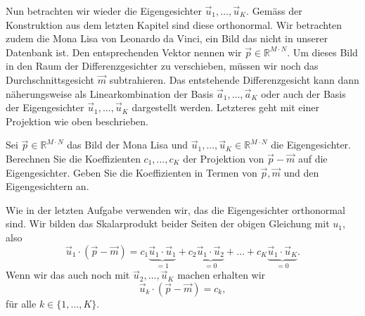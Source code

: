 Nun betrachten wir wieder die Eigengesichter $\vec u_1,\ldots,\vec u_K$.
Gemäss der Konstruktion aus dem letzten Kapitel sind diese orthonormal.
Wir betrachten zudem die Mona Lisa von Leonardo da Vinci, ein Bild das nicht in unserer Datenbank ist.
Den entsprechenden Vektor nennen wir $\vec p\in\mathbb R^{M\cdot N}$.
Um dieses Bild in den Raum der Differenzgesichter zu verschieben, müssen wir noch das Durchschnittsgesicht $\vec m$ subtrahieren.
Das entstehende Differenzgesicht kann dann näherungsweise als Linearkombination der Basis $\vec a_1,\ldots,\vec a_K$ oder auch der Basis der Eigengesichter $\vec u_1,\ldots,\vec u_K$ dargestellt werden.
Letzteres geht mit einer Projektion wie oben beschrieben.
\begin{aufgabe}
	Sei $\vec p\in\mathbb R^{M\cdot N}$ das Bild der Mona Lisa und $\vec u_1,\ldots,\vec u_K\in\mathbb R^{M\cdot N}$ die Eigengesichter.
	Berechnen Sie die Koeffizienten $c_1,\ldots,c_K$ der Projektion von $\vec p-\vec m$ auf die Eigengesichter.
	Geben Sie die Koeffizienten in Termen von $\vec p, \vec m$ und den Eigengesichtern an.
\end{aufgabe}
\begin{losung*}
	Wie in der letzten Aufgabe verwenden wir, das die Eigengesichter orthonormal sind.
	Wir bilden das Skalarprodukt beider Seiten der obigen Gleichung mit $u_1$, also
	\begin{equation*}
		\vec u_1\cdot\left(\vec p-\vec m\right)=c_1\underbrace{\vec u_1\cdot\vec u_1}_{=1}+c_2\underbrace{\vec u_1\cdot\vec u_2}_{=0}+\ldots+c_K\underbrace{\vec u_1\cdot\vec u_K}_{=0}.
	\end{equation*}
	Wenn wir das auch noch mit $\vec u_2,\ldots,\vec u_K$ machen erhalten wir
	\begin{equation*}
		\vec u_k\cdot\left(\vec p-\vec m\right)=c_k,
	\end{equation*}
	für alle $k\in\{1,\ldots,K\}$.
\end{losung*}

